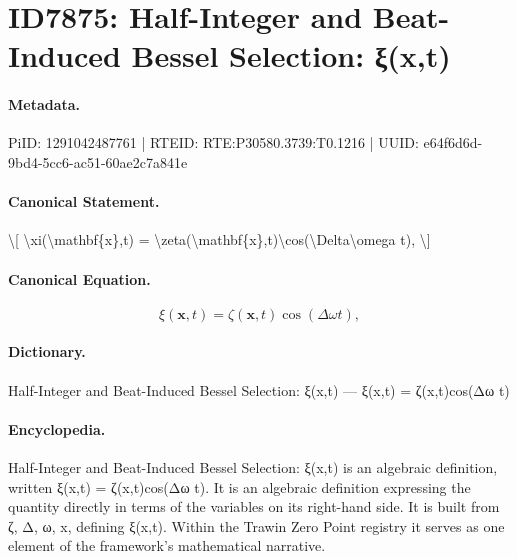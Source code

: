 \section*{ID7875: Half-Integer and Beat-Induced Bessel Selection: ξ(x,t)}
\paragraph{Metadata.}
PiID: 1291042487761 | RTEID: RTE:P30580.3739:T0.1216 | UUID: e64f6d6d-9bd4-5cc6-ac51-60ae2c7a841e

\paragraph{Canonical Statement.}
\textbackslash{}[ \textbackslash{}xi(\textbackslash{}mathbf\{x\},t) = \textbackslash{}zeta(\textbackslash{}mathbf\{x\},t)\textbackslash{}cos(\textbackslash{}Delta\textbackslash{}omega t), \textbackslash{}]

\paragraph{Canonical Equation.}
\[
\xi(\mathbf{x},t) = \zeta(\mathbf{x},t)\cos(\Delta\omega t),
\]

\paragraph{Dictionary.}
Half-Integer and Beat-Induced Bessel Selection: ξ(x,t) — ξ(x,t) = ζ(x,t)cos(Δω t)

\paragraph{Encyclopedia.}
Half-Integer and Beat-Induced Bessel Selection: ξ(x,t) is an algebraic definition, written ξ(x,t) = ζ(x,t)cos(Δω t). It is an algebraic definition expressing the quantity directly in terms of the variables on its right-hand side. It is built from ζ, Δ, ω, x, defining ξ(x,t). Within the Trawin Zero Point registry it serves as one element of the framework's mathematical narrative.
